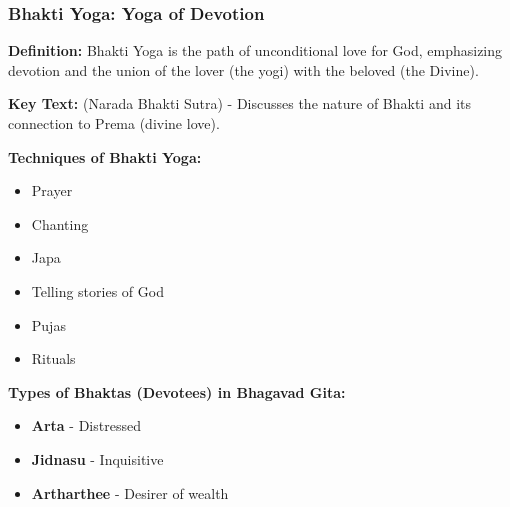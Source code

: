 \begin{frame}[fragile]\frametitle{Bhakti Yoga: Yoga of Devotion}
    \textbf{Definition:} Bhakti Yoga is the path of unconditional love for God, emphasizing devotion and the union of the lover (the yogi) with the beloved (the Divine).

    \vspace{0.5cm}
    \textbf{Key Text:}  (Narada Bhakti Sutra) - Discusses the nature of Bhakti and its connection to Prema (divine love).

    \vspace{0.5cm}
    \textbf{Techniques of Bhakti Yoga:}
    \begin{itemize}
        \item Prayer
        \item Chanting
        \item Japa
        \item Telling stories of God
        \item Pujas
        \item Rituals
    \end{itemize}

    \vspace{0.5cm}
    \textbf{Types of Bhaktas (Devotees) in Bhagavad Gita:}
    \begin{itemize}
        \item \textbf{Arta} - Distressed
        \item \textbf{Jidnasu} - Inquisitive
        \item \textbf{Artharthee} - Desirer of wealth
    \end{itemize}
\end{frame}

